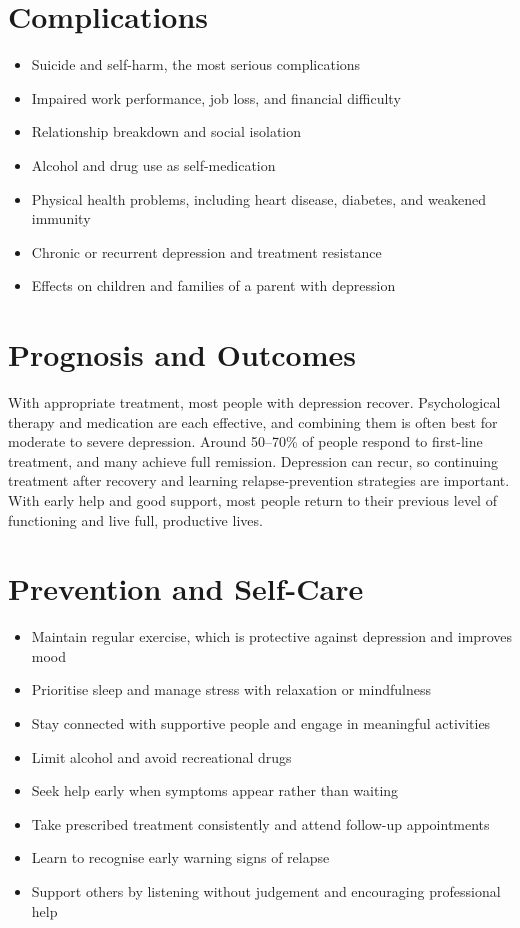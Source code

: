 \section*{Complications}
\begin{itemize}
    \item Suicide and self-harm, the most serious complications
    \item Impaired work performance, job loss, and financial difficulty
    \item Relationship breakdown and social isolation
    \item Alcohol and drug use as self-medication
    \item Physical health problems, including heart disease, diabetes, and weakened immunity
    \item Chronic or recurrent depression and treatment resistance
    \item Effects on children and families of a parent with depression
\end{itemize}

\section*{Prognosis and Outcomes}
With appropriate treatment, most people with depression recover. Psychological therapy and medication are each effective, and combining them is often best for moderate to severe depression. Around 50--70\% of people respond to first-line treatment, and many achieve full remission. Depression can recur, so continuing treatment after recovery and learning relapse-prevention strategies are important. With early help and good support, most people return to their previous level of functioning and live full, productive lives.

\section*{Prevention and Self-Care}
\begin{itemize}
    \item Maintain regular exercise, which is protective against depression and improves mood
    \item Prioritise sleep and manage stress with relaxation or mindfulness
    \item Stay connected with supportive people and engage in meaningful activities
    \item Limit alcohol and avoid recreational drugs
    \item Seek help early when symptoms appear rather than waiting
    \item Take prescribed treatment consistently and attend follow-up appointments
    \item Learn to recognise early warning signs of relapse
    \item Support others by listening without judgement and encouraging professional help
\end{itemize}

